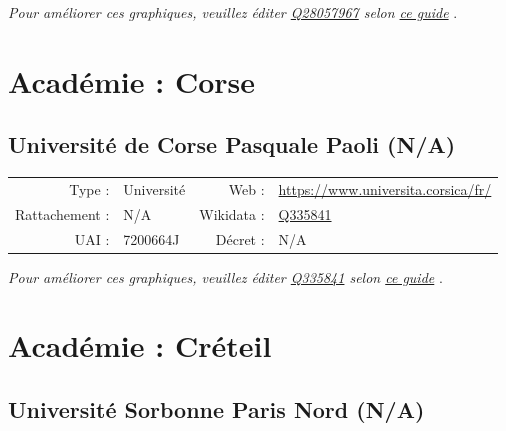 \documentclass[11pt,french,landscape]{article}
\begin{document}
\textit{\scriptsize Pour améliorer ces graphiques, veuillez éditer \href{https://www.wikidata.org/entity/Q28057967}{Q28057967}  selon \href{https://github.com/cpesr/wikidataESR/blob/master/Rmd/wikidataESR.md}{ce guide}}
.


\newpage

\hypertarget{acaduxe9mie-corse}{%
\section{Académie : Corse}\label{acaduxe9mie-corse}}

\hypertarget{universituxe9-de-corse-pasquale-paoli-na}{%
\subsection{Université de Corse Pasquale Paoli
(N/A)}\label{universituxe9-de-corse-pasquale-paoli-na}}

\begin{tabular*}{0.45\textwidth}{rp{2cm}rl}  
\hline  
Type : & Université & Web : &\href{https://www.universita.corsica/fr/}{https://www.universita.corsica/fr/} \\  
Rattachement : & N/A & Wikidata : & \href{https://www.wikidata.org/entity/Q335841}{Q335841} \\  
UAI : & 7200664J & Décret : & N/A \\  
\hline  
\end{tabular*}

\textit{\scriptsize Pour améliorer ces graphiques, veuillez éditer \href{https://www.wikidata.org/entity/Q335841}{Q335841}  selon \href{https://github.com/cpesr/wikidataESR/blob/master/Rmd/wikidataESR.md}{ce guide}}
.


\newpage

\hypertarget{acaduxe9mie-cruxe9teil}{%
\section{Académie : Créteil}\label{acaduxe9mie-cruxe9teil}}

\hypertarget{universituxe9-sorbonne-paris-nord-na}{%
\subsection{Université Sorbonne Paris Nord
(N/A)}\label{universituxe9-sorbonne-paris-nord-na}}
\end{document}
